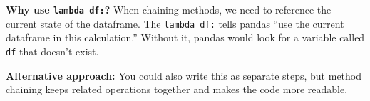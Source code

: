\documentclass[
  letterpaper,
  DIV=11,
  numbers=noendperiod]{scrartcl}
\begin{document}
\begin{tcolorbox}[enhanced jigsaw, toptitle=1mm, opacityback=0, colframe=quarto-callout-tip-color-frame, leftrule=.75mm, arc=.35mm, opacitybacktitle=0.6, breakable, titlerule=0mm, coltitle=black, bottomtitle=1mm, title=\textcolor{quarto-callout-tip-color}{\faLightbulb}\hspace{0.5em}{💡 Method Chaining Tip for New Python Users}, colbacktitle=quarto-callout-tip-color!10!white, rightrule=.15mm, left=2mm, bottomrule=.15mm, toprule=.15mm, colback=white]

\textbf{Why use \texttt{lambda\ df:}?} When chaining methods, we need to
reference the current state of the dataframe. The \texttt{lambda\ df:}
tells pandas ``use the current dataframe in this calculation.'' Without
it, pandas would look for a variable called \texttt{df} that doesn't
exist.

\textbf{Alternative approach:} You could also write this as separate
steps, but method chaining keeps related operations together and makes
the code more readable.

\end{tcolorbox}
\end{document}
